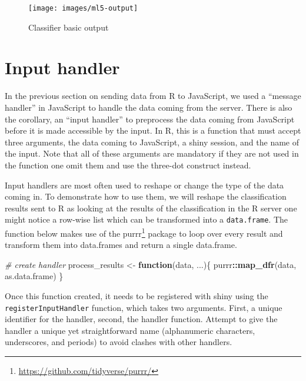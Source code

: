 \documentclass[
  10pt,
]{krantz}
\makeatletter
\newenvironment{Shaded}{\begin{snugshade}}{\end{snugshade}}
\newcommand{\CommentTok}[1]{\textcolor[rgb]{0.37,0.37,0.37}{\textit{#1}}}
\newcommand{\ControlFlowTok}[1]{\textcolor[rgb]{0.27,0.27,0.27}{\textbf{#1}}}
\newcommand{\KeywordTok}[1]{\textcolor[rgb]{0.27,0.27,0.27}{\textbf{#1}}}
\newcommand{\NormalTok}[1]{#1}
\newcommand{\OperatorTok}[1]{\textcolor[rgb]{0.43,0.43,0.43}{\textbf{#1}}}
\newcommand{\StringTok}[1]{\textcolor[rgb]{0.5,0.5,0.5}{#1}}
\renewcommand{\href}[2]{#2\footnote{\url{#1}}}
\newenvironment{kframe}{%
\medskip{}
\setlength{\fboxsep}{.8em}
 \def\at@end@of@kframe{}%
 \ifinner\ifhmode%
  \def\at@end@of@kframe{\end{minipage}}%
  \begin{minipage}{\columnwidth}%
 \fi\fi%
 \def\FrameCommand##1{\hskip\@totalleftmargin \hskip-\fboxsep
 \colorbox{shadecolor}{##1}\hskip-\fboxsep
     \hskip-\linewidth \hskip-\@totalleftmargin \hskip\columnwidth}%
 \MakeFramed {\advance\hsize-\width
   \@totalleftmargin\z@ \linewidth\hsize
   \@setminipage}}%
 {\par\unskip\endMakeFramed%
 \at@end@of@kframe}
\renewenvironment{Shaded}{\begin{kframe}}{\end{kframe}}
\makeatother
\begin{document}
\begin{figure}[H]

{\centering \texttt{[image: images/ml5-output]} 

}

\caption{Classifier basic output}\label{fig:shiny-complete-ml5-output}
\end{figure}

\hypertarget{shiny-complete-input-handler}{%
\section{Input handler}\label{shiny-complete-input-handler}}

In the previous section on sending data from R to JavaScript, we used a ``message handler'' in JavaScript to handle the data coming from the server. There is also the corollary, an ``input handler'' to preprocess the data coming from JavaScript before it is made accessible by the input. In R, this is a function that must accept three arguments, the data coming to JavaScript, a shiny session, and the name of the input. Note that all of these arguments are mandatory if they are not used in the function one omit them and use the three-dot construct instead.

Input handlers are most often used to reshape or change the type of the data coming in. To demonstrate how to use them, we will reshape the classification results sent to R as looking at the results of the classification in the R server one might notice a row-wise list which can be transformed into a \texttt{data.frame}. The function below makes use of the \href{https://github.com/tidyverse/purrr/}{purrr} \citep{R-purrr} package to loop over every result and transform them into data.frames and return a single data.frame.

\begin{Shaded}
\begin{Highlighting}[]
\CommentTok{\# create handler}
\NormalTok{process\_results <{-}}\StringTok{ }\ControlFlowTok{function}\NormalTok{(data, ...)\{}
\NormalTok{  purrr}\OperatorTok{::}\KeywordTok{map\_dfr}\NormalTok{(data, as.data.frame)}
\NormalTok{\}}
\end{Highlighting}
\end{Shaded}

Once this function created, it needs to be registered with shiny using the \texttt{registerInputHandler} function, which takes two arguments. First, a unique identifier for the handler, second, the handler function. Attempt to give the handler a unique yet straightforward name (alphanumeric characters, underscores, and periods) to avoid clashes with other handlers.
\end{document}
